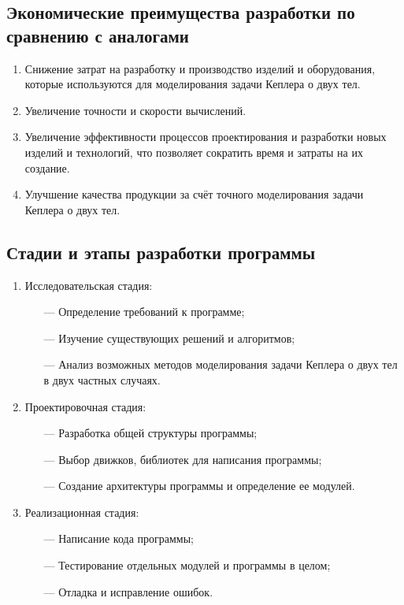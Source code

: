  \subsection{Экономические преимущества разработки по сравнению с аналогами}
 \begin{enumerate}
  \item Снижение затрат на разработку и производство изделий и оборудования, которые используются для моделирования задачи Кеплера о двух тел.
  \item Увеличение точности и скорости вычислений.
  \item Увеличение эффективности процессов проектирования и разработки новых изделий и технологий, что позволяет сократить время и затраты на их создание.
  \item Улучшение качества продукции за счёт точного моделирования задачи Кеплера о двух тел.
 \end{enumerate}

 \subsection{Стадии и этапы разработки программы}
 \begin{enumerate}
  \item Исследовательская стадия:
   \begin{itemize}
    \item[—] Определение требований к программе;
    \item[—] Изучение существующих решений и алгоритмов;
    \item[—] Анализ возможных методов моделирования задачи Кеплера о двух тел в двух частных случаях.
   \end{itemize}
     \item Проектировочная стадия:
   \begin{itemize}
    \item[—] Разработка общей структуры программы;
    \item[—] Выбор движков, библиотек для написания программы;
    \item[—] Создание архитектуры программы и определение ее модулей.
   \end{itemize}
     \item Реализационная стадия:
   \begin{itemize}
    \item[—] Написание кода программы;
    \item[—] Тестирование отдельных модулей и программы в целом;
    \item[—] Отладка и исправление ошибок.
   \end{itemize}
 \end{enumerate}




